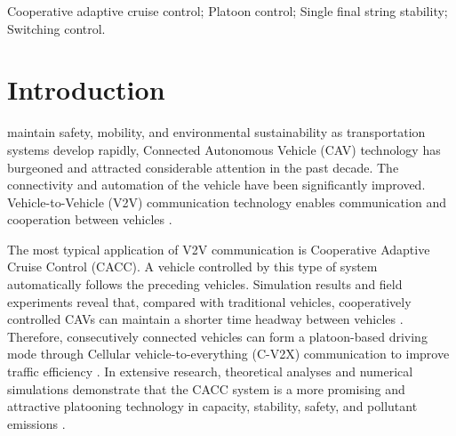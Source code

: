 \documentclass[journal]{IEEEtran}
\begin{document}
\begin{IEEEkeywords}
  Cooperative adaptive cruise control; Platoon control; Single final string stability; Switching control.
\end{IEEEkeywords}






%
\IEEEpeerreviewmaketitle



\section{Introduction}
\label{Section 1}
% 
% 
% 
% 
 maintain safety, mobility, and environmental sustainability as transportation systems develop rapidly, Connected Autonomous Vehicle (CAV) technology has burgeoned and attracted considerable attention in the past decade. The connectivity and automation of the vehicle have been significantly improved. Vehicle-to-Vehicle (V2V) communication technology enables communication and cooperation between vehicles \citep{wang2019survey,ploeg2011design,zhou2021impact}.

The most typical application of V2V communication is Cooperative Adaptive Cruise Control (CACC). A vehicle controlled by this type of system automatically follows the preceding vehicles. Simulation results and field experiments reveal that, compared with traditional vehicles, cooperatively controlled CAVs can maintain a shorter time headway between vehicles \citep{vander2002effects}. Therefore, consecutively connected vehicles can form a platoon-based driving mode through Cellular vehicle-to-everything (C-V2X) communication to improve traffic efficiency \citep{VerizonNorth2020,gong2018cooperative,wang2020cooperative}. In extensive research, theoretical analyses and numerical simulations demonstrate that the CACC system is a more promising and attractive platooning technology in capacity, stability, safety, and pollutant emissions \citep{liu2018impact,xiao2018unravelling}.
\end{document}
